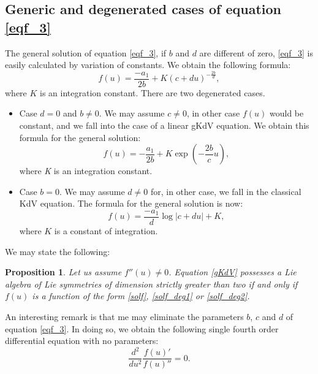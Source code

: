 \documentclass[
11pt,%
tightenlines,%
twoside,%
onecolumn,%
nofloats,%
nobibnotes,%
nofootinbib,%
superscriptaddress,%
noshowpacs,%
centertags]%
{revtex4}
\newtheorem{proposition}{Proposition}
\begin{document}
\subsection{Generic and degenerated cases of equation \eqref{eqf_3}}

The general solution of equation \eqref{eqf_3}, if $b$ and $d$ are different of zero, \eqref{eqf_3} is easily calculated by variation of constants. We obtain the following formula:
\begin{equation}\label{solf}
f(u) = \frac{-a_1}{2b} + K(c+du)^{-\frac{2b}{d}},
\end{equation}
where $K$ is an integration constant. There are two degenerated cases.

\begin{itemize}

\item Case $d=0$ and $b\neq 0$. We may assume $c\neq 0$, in other case $f(u)$ would be constant, and we fall into the case of a linear gKdV equation. We obtain this formula for the general solution:
\begin{equation}\label{solf_deg1}
f(u)= -\frac{a_1}{2b} + K \exp\left( -\frac{2b}{c}u \right),
\end{equation}
where  \textit{K} is an integration constant. 

\item Case $b=0$. We may assume $d\neq 0$ for, in other case, we fall in the classical KdV equation. The formula for the general solution is now:
\begin{equation}\label{solf_deg2}
f(u) = \frac{-a_1}{d}\log \left|c+du\right|+ K,
\end{equation}
where $K$ is a constant of integration. 
\end{itemize}

We may state the following:

\begin{proposition}
Let us assume $f''(u) \neq 0$. Equation \eqref{gKdV} possesses a Lie algebra of Lie symmetries of dimension strictly greater than two if and only if
 $f(u)$ is a function of the form \eqref{solf}, \eqref{solf_deg1} or \eqref{solf_deg2}.
\end{proposition}

An interesting remark is that me may eliminate the parameters $b$, $c$ and $d$ of equation \eqref{eqf_3}. In doing so, we obtain the following single fourth order differential equation with no parameters: 
\begin{equation}\label{equationd2dlog}
\frac{d^2}{du^2}\frac{f(u)'}{f(u)''} = 0.
\end{equation}
\end{document}
